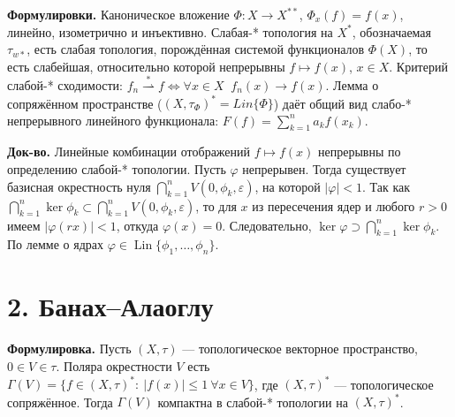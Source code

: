 \documentclass[10pt,a4paper]{article}
\newcommand{\X}{X}
\begin{document}
	\textbf{Формулировки.}
	Каноническое вложение $\Phi:X\to X^{**}$, $\Phi_x(f)=f(x)$, линейно, изометрично и инъективно.
	Слабая-* топология на $X^*$, обозначаемая $\tau_{w*}$, есть слабая топология, порождённая системой функционалов $\Phi(X)$, то есть слабейшая, относительно которой непрерывны $f\mapsto f(x)$, $x\in X$.
	Критерий слабой-* сходимости:
	$f_n\overset{*}{\rightharpoonup}f \iff \forall x\in X\;\; f_n(x)\to f(x)$.
	Лемма о сопряжённом пространстве ($(X, \tau_{\Phi})^* = Lin\{\Phi\}$) даёт общий вид слабо-* непрерывного линейного функционала: $F(f)=\sum_{k=1}^n a_k f(x_k)$.

	\textbf{Док-во.}
	Линейные комбинации отображений $f\mapsto f(x)$ непрерывны по определению слабой-* топологии.
	Пусть $\varphi$ непрерывен. Тогда существует базисная окрестность нуля $\bigcap_{k=1}^nV(0,\phi_k,\varepsilon)$, на которой $|\varphi|<1$.
	Так как $\bigcap_{k=1}^n\ker\phi_k\subset\bigcap_{k=1}^nV(0,\phi_k,\varepsilon)$, то для $x$ из пересечения ядер и любого $r>0$ имеем $|\varphi(rx)|<1$, откуда $\varphi(x)=0$.
	Следовательно, $\ker\varphi\supset\bigcap_{k=1}^n\ker\phi_k$.
	По лемме о ядрах $\varphi\in\operatorname{Lin}\{\phi_1,\ldots,\phi_n\}$.



	\section*{2. Банах--Алаоглу}
	\textbf{Формулировка.} Пусть $(\X,\tau)$ --- топологическое векторное пространство, $0\in V\in\tau$. Поляра окрестности $V$ есть $\Gamma(V)=\{f\in(\X,\tau)^\ast:\ |f(x)|\le1\ \forall x\in V\}$, где $(\X,\tau)^\ast$ --- топологическое сопряжённое. Тогда $\Gamma(V)$ компактна в слабой-* топологии на $(\X,\tau)^\ast$.
\end{document}
